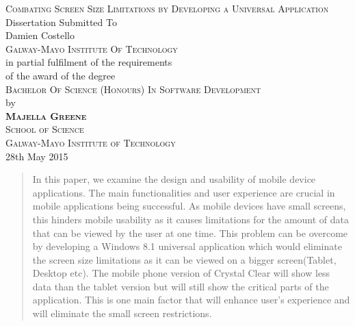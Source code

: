 \documentclass[runningheads,a4paper]{llncs}
\begin{document}
\mainmatter  %

\begin{titlepage}

\begin{center}
\Huge{\textsc{Combating Screen Size Limitations by Developing a Universal Application}} \\
\vspace{4em}
\large{Dissertation Submitted To} \\
Damien Costello \\
\vspace{2em}
\Large{\textsc{Galway-Mayo Institute Of Technology}} \\
\vspace{1em}
\large{in partial fulfilment of the requirements} \\
\large{of the award of the degree} \\
\vspace{2em}
\Large{\textsc{Bachelor Of Science (Honours) In Software Development}} \\
\vspace{2em}
by \\
\vspace{1em}
\textbf{\textsc{Majella Greene}} \\
\vspace{4em}
\Large{\textsc{School of Science}} \\
\Large{\textsc{Galway-Mayo Institute of Technology}} \\
\Large{28th May 2015}
\end{center}
\end{titlepage}
\newpage\setcounter{tocdepth}{2}
\tableofcontents\newpage


\begin{abstract}
In this paper, we examine the design and usability of mobile device applications. The main functionalities and user experience are crucial in mobile applications being successful. As mobile devices have small screens, this hinders mobile usability as it causes limitations for the amount of data that can be viewed by the user at one time. This problem can be overcome by developing a Windows 8.1 universal application which would eliminate the screen size limitations as it can be viewed on a bigger screen(Tablet, Desktop etc). The mobile phone version of Crystal Clear will show less data than the tablet version but will still show the critical parts of the application. This is one main factor that will enhance user's experience and will eliminate the small screen restrictions.
\end{abstract}
\end{document}
